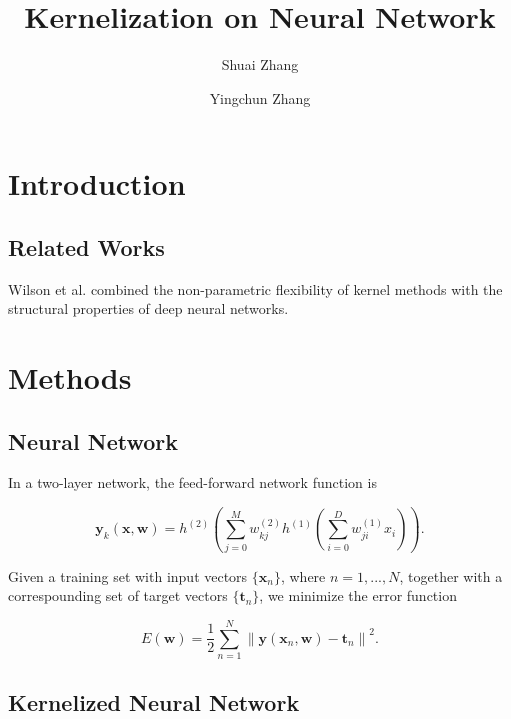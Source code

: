 \documentclass{article}
\begin{document}
\title{Kernelization on Neural Network}
\author{Shuai Zhang\and Yingchun Zhang}
\maketitle

\section{Introduction}

\subsection{Related Works}
Wilson et al. combined the non-parametric flexibility of kernel methods with the structural properties of deep neural networks.




\section{Methods}

\subsection{Neural Network}

In a two-layer network, the feed-forward network function is

\begin{equation}
\mathbf{y}_k(\mathbf{x}, \mathbf{w}) = h^{(2)}\left(\sum_{j=0}^{M}w_{kj}^{(2)}h^{(1)}\left(\sum_{i=0}^{D}w_{ji}^{(1)}x_i\right)\right).
\end{equation}

Given a training set with input vectors $\{\mathbf{x}_n\}$, where $n = 1, ..., N$, together with a correspounding set of target vectors $\{\mathbf{t}_n\}$, we minimize the error function

\begin{equation}
E(\mathbf{w}) = \frac{1}{2} \sum_{n=1}^{N} {\|\mathbf{y}(\mathbf{x}_n, \mathbf{w}) - \mathbf{t}_n\|}^2.
\end{equation}




\subsection{Kernelized Neural Network}
\end{document}
